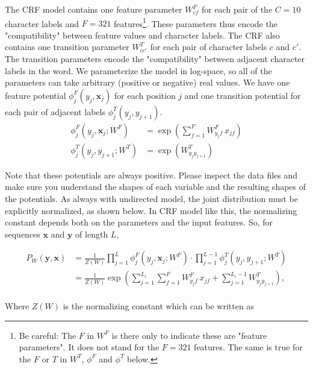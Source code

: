 \documentclass[11pt]{article}
\newcommand{\mbf}[1]{{\mathbf{#1}}} \newcommand{\eq}{\!=\!}
\begin{document}
The CRF model contains one feature parameter $W^F_{cf}$ for each pair of the $C=10$  character labels and $F=321$ features\footnote{Be careful: The $F$ in $W^F$ is there only to indicate these are "feature parameters". It does not stand for the $F=321$ features. The same is true for the $F$ or $T$ in $W^T$, $\phi^F$ and $\phi^T$ below.}. These parameters thus encode the
"compatibility" between feature values and character labels. The CRF also
contains one transition parameter $W^T_{cc'}$ for each pair of character labels
$c$ and $c'$.  The transition parameters encode the "compatibility" between
adjacent character labels in the word. We parameterize the model in log-space,
so all of the parameters can take arbitrary (positive or negative) real values.
We have one feature potential $\phi^F_j(y_{j},\mbf{x}_{j})$ for each position
$j$ and one transition potential for each pair of adjacent labels
$\phi^T_j(y_{j},y_{j+1})$.
%
\begin{align*}
  \phi^F_j(y_{j},\mbf{x}_{j};W^F) &= \exp \left( \sum_{f=1}^F W^F_{y_{j}f} \, x_{jf}  \right) \\
  \phi^T_{j}(y_{j},y_{j+1};W^T) &= \exp \left(W^T_{y_{j}y_{j+1}} \right)
\end{align*}
%


Note that these potentials are always positive. Please inspect the data files and
make sure you understand the shapes of each variable and the resulting shapes
of the potentials. As always with undirected model, the joint
distribution must be explicitly normalized, as shown below. In CRF model like this, the normalizing constant depends both on the parameters and the input features. So, for sequences $\mbf{x}$ and $\mbf{y}$ of length $L$,

\begin{align*}
P_{W}(\mbf{y}, \mbf{x})
&=\frac{1}{Z(W)} \prod_{j=1}^{L}\phi^F_j(y_{j},\mbf{x}_{j};W^F) \cdot \prod_{j=1}^{L-1}\phi^T_j(y_{j},y_{j+1};W^T)
       \\
&= \frac{1}{Z(W)}
     \exp\left(\sum_{j=1}^{L_i}\sum_{f=1}^F W^F_{y_j f} \, x_{jf}
     +\sum_{j=1}^{L_i-1}W^T_{y_j y_{j+1}} \right),
\end{align*}\\

\noindent Where $Z(W)$ is the normalizing constant which can be written as
\end{document}
